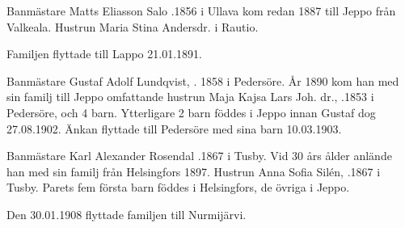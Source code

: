 {Banmästare Matts Eliasson Salo .1856 i Ullava kom redan 1887 till Jeppo från Valkeala. Hustrun Maria Stina Andersdr.  i Rautio.
\begin{jhchildren}
  \item {}
  \item {}
  \item {}
\end{jhchildren}
Familjen flyttade till Lappo 21.01.1891.


Banmästare Gustaf Adolf Lundqvist, . 1858 i Pedersöre. År 1890 kom han med sin familj till Jeppo omfattande hustrun Maja Kajsa Lars Joh. dr., .1853 i Pedersöre, och 4 barn. Ytterligare 2 barn föddes i Jeppo innan Gustaf dog 27.08.1902. Änkan flyttade till Pedersöre med sina barn 10.03.1903.
\begin{jhchildren}
  \item {}
  \item {}
  \item {}
  \item {}
  \item {}
  \item {}
\end{jhchildren}


Banmästare Karl Alexander Rosendal .1867 i Tusby. Vid 30 års ålder anlände han med sin familj från Helsingfors 1897. Hustrun Anna Sofia Silén, .1867 i Tusby. Parets fem första barn föddes i Helsingfors, de övriga i Jeppo.
\begin{jhchildren}
  \item {}
  \item {}
  \item {}
  \item {}
  \item {}
  \item {}
  \item {}
  \item {}
  \item {}
\end{jhchildren}
Den 30.01.1908 flyttade familjen till Nurmijärvi.

}
